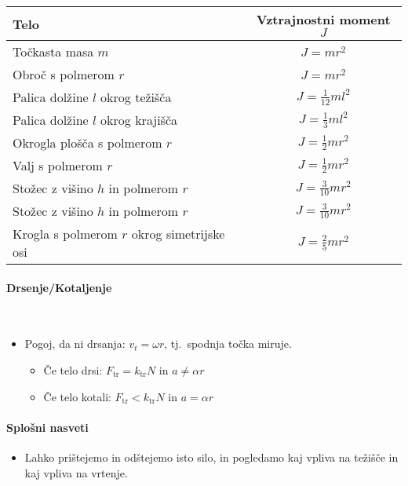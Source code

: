 \begin{table}[h!]
    \centering
    \begin{tabular}{|l|c|}
    \hline
    \textbf{Telo} & \textbf{Vztrajnostni moment \(J\)} \\
    \hline
    Točkasta masa \(m\) & $J = mr^2$  \\
    \hline
    Obroč s polmerom \(r\) & \(J = mr^2\) \\
    \hline
    Palica dolžine \(l\) okrog težišča & \(J = \frac{1}{12}ml^2\) \\
    \hline
    Palica dolžine \(l\) okrog krajišča & \(J = \frac{1}{3}ml^2\) \\
    \hline
    Okrogla plošča s polmerom \(r\) & \(J = \frac{1}{2}mr^2\) \\
    \hline
    Valj s polmerom \(r\) & \(J = \frac{1}{2}mr^2\) \\
    \hline
    Stožec z višino \(h\) in polmerom \(r\) & \(J = \frac{3}{10}mr^2\) \\
    \hline
    Stožec z višino \(h\) in polmerom \(r\) & \(J = \frac{3}{10}mr^2\) \\
    \hline
    Krogla s polmerom \(r\) okrog simetrijske osi & \(J = \frac{2}{5}mr^2\) \\
    \hline
    \end{tabular}
\end{table}

\paragraph{Drsenje/Kotaljenje} \ 
\begin{itemize}
    \item Pogoj, da ni drsanja: \(v_t = \omega r\), tj.\ spodnja točka miruje.
    \begin{itemize}
        \item Če telo drsi: \(F_\text{tr} = k_\text{tr} N\) in \(a \neq \alpha r\)
        \item Če telo kotali: \(F_\text{tr} < k_\text{tr} N\) in \(a = \alpha r\)
    \end{itemize} 
\end{itemize}

\paragraph{Splošni nasveti}
\begin{itemize}
    \item Lahko prištejemo in odštejemo isto silo, in pogledamo kaj vpliva na težišče in kaj vpliva na vrtenje.
\end{itemize}

